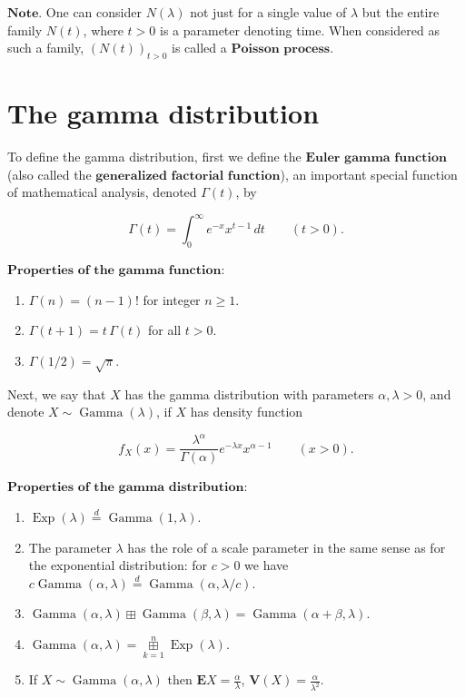 \documentclass[11pt]{report}
\theoremstyle{plain}
\theoremstyle{definition}
\begin{document}
$\textbf{Note.}$ One can consider $N(\lambda)$ not
just for a single value of $\lambda$ but the entire
family $N(t)$, where $t>0$ is a parameter denoting
time. When considered as such a family, $(N(t))_{t>0}$
is called a $\textbf{Poisson process}$.

\section{The gamma distribution}
To define the gamma distribution, first we define the
$\textbf{Euler gamma function}$ (also called the
$\textbf{generalized factorial function}$), an
important special function of mathematical analysis,
denoted $\Gamma(t)$, by

\[
\Gamma(t) = \int_0^\infty e^{-x} x^{t-1}\,dt \qquad (t>0).
\]

$\textbf{Properties of the gamma function:}$

\begin{enumerate}[label=\arabic*.]
\item $\Gamma(n)=(n-1)!$ for integer $n\ge1$.

\item $\Gamma(t+1) = t\, \Gamma(t)$ for all $t>0$.

\item $\Gamma(1/2)=\sqrt{\pi}$.
\end{enumerate}

Next, we say that $X$ has the gamma distribution with
parameters $\alpha, \lambda>0$, and denote
$X\sim \operatorname{Gamma}(\lambda)$, if $X$ has
density function

\[
f_X(x) = \frac{\lambda^\alpha}{\Gamma(\alpha)} e^{-\lambda x} x^{\alpha-1} \qquad (x>0).
\]

$\textbf{Properties of the gamma distribution:}$

\begin{enumerate}[label=\arabic*.]
\item $\operatorname{Exp}(\lambda) \stackrel{d}{=}
\operatorname{Gamma}(1,\lambda)$.

\item The parameter $\lambda$ has the role of a scale
parameter in the same sense as for the exponential
distribution: for $c>0$ we have
$c \operatorname{Gamma}(\alpha,\lambda)
\stackrel{d}{=} \operatorname{Gamma}(\alpha,
\lambda/c)$.

\item $\operatorname{Gamma}(\alpha,\lambda) \boxplus
\operatorname{Gamma}(\beta,\lambda) =
\operatorname{Gamma}(\alpha+\beta,\lambda)$.

\item $\operatorname{Gamma}(\alpha,\lambda) =
\mathop{\boxplus}\limits_{k=1}^n
\operatorname{Exp}(\lambda)$.

\item If $X\sim \operatorname{Gamma}(\alpha,\lambda)$ then
$\mathbf{E} X = \frac{\alpha}{\lambda}$,
$\mathbf{V}(X) = \frac{\alpha}{\lambda^2}$.
\end{enumerate}
\end{document}

